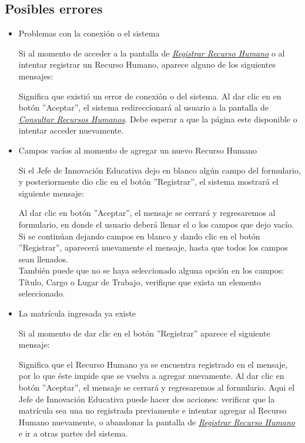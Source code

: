         \subsection{Posibles errores}
            \begin{itemize}
            
            	\item Problemas con la conexión o el sistema
                
                	Si al momento de acceder a la pantalla de \hyperlink{registrarrh}{\textit{Registrar Recurso Humano}} o al intentar registrar un Recurso Humano, aparece alguno de los siguientes mensajes:
                
                	Significa que existió un error de conexión o del sistema. Al dar clic en en botón ''Aceptar'', el sistema redireccionará al usuario a la pantalla de \hyperlink{consultarrh}{\textit{Consultar Recursos Humanos}}. Debe esperar a que la página este disponible o intentar acceder nuevamente.
                
            	\item Campos vacíos al momento de agregar un nuevo Recurso Humano
            
                	Si el Jefe de Innovación Educativa dejo en blanco algún campo del formulario, y posteriormente dio clic en el botón ''Registrar'', el sistema mostrará el siguiente mensaje:
                
                	Al dar clic en botón ''Aceptar'', el mensaje se cerrará y regresaremos al formulario, en donde el usuario deberá llenar el o los campos que dejo vacío. Si se continúan dejando campos en blanco y dando clic en el botón ''Registrar'', aparecerá nuevamente el mensaje, hasta que todos los campos sean llenados.\\
                
                	También puede que no se haya seleccionado alguna opción en los campos: Título, Cargo o Lugar de Trabajo, verifique que exista un elemento seleccionado.
                
            	\item La matrícula ingresada ya existe
            
                	Si al momento de dar clic en el botón ''Registrar'' aparece el siguiente mensaje:
            
                	Significa que el Recurso Humano ya se encuentra registrado en el mensaje, por lo que éste impide que se vuelva a agregar nuevamente. Al dar clic en botón ''Aceptar'', el mensaje se cerrará y regresaremos al formulario. Aqui el Jefe de Innovación Educativa puede hacer dos acciones: verificar que la matrícula sea una no registrada previamente e intentar agregar al Recurso Humano nuevamente, o abandonar la pantalla de \hyperlink{registrarrh}{\textit{Registrar Recurso Humano}} e ir a otras partes del sistema.
            

\end{itemize}
